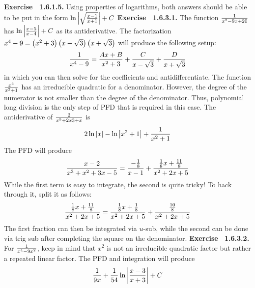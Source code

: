 {\noindent \protect \bf  Exercise ~1.6.1.5.} Using properties of logarithms, both answers should be able to be put in the form $\protect \qopname  \relax o{ln}\left | \protect \sqrt  {\protect \frac  {x-1}{x+1}}\right |+C$ \protect \newline  \protect \newline  
 {\noindent \protect \bf  Exercise ~1.6.3.1.} \textbullet The function $\protect \frac  {1}{x^2-9x+20}$ has $\protect \qopname  \relax o{ln}\left |\protect \frac  {x-5}{x-4}\right |+C$ as its antiderivative. \textbullet The factorization $x^4-9=\left (x^2+3\right )\left (x-\protect \sqrt  {3}\right )\left (x+\protect \sqrt  {3}\right )$ will produce the following setup: $$\protect \frac  {1}{x^4-9}=\protect \frac  {Ax+B}{x^2+3}+\protect \frac  {C}{x-\protect \sqrt  {3}}+\protect \frac  {D}{x+\protect \sqrt  {3}} $$ in which you can then solve for the coefficients and antidifferentiate. \textbullet The function $\protect \frac  {x^4}{x^2+1}$ has an irreducible quadratic for a denominator. However, the degree of the numerator is not smaller than the degree of the denominator. Thus, polynomial long division is the only step of PFD that is required in this case. \textbullet The antiderivative of $\protect \frac  {2}{x^5+2x3+x}$ is $$2\protect \qopname  \relax o{ln}|x|-\protect \qopname  \relax o{ln}\left | x^2+1\right |+\protect \frac  {1}{x^2+1}$$ \textbullet The PFD will produce $$ \protect \frac  {x-2}{x^3+x^2+3x-5}=\protect \frac  {-\protect \frac  {1}{8}}{x-1}+\protect \frac  {\protect \frac  {1}{8}x+\protect \frac  {11}{8}}{x^2+2x+5}$$ While the first term is easy to integrate, the second is quite tricky! To hack through it, split it as follows: $$\protect \frac  {\protect \frac  {1}{8}x+\protect \frac  {11}{8}}{x^2+2x+5}=\protect \frac  {\protect \frac  {1}{8}x+\protect \frac  {1}{8}}{x^2+2x+5}+\protect \frac  {\protect \frac  {10}{8}}{x^2+2x+5} $$ The first fraction can then be integrated via $u$-sub, while the second can be done via trig sub after completing the square on the denominator. \protect \newline  \protect \newline  
 {\noindent \protect \bf  Exercise ~1.6.3.2.} For $\protect \frac  {1}{x^4-9x^2}$, keep in mind that $x^2$ is not an irreducible quadratic factor but rather a repeated linear factor. The PFD and integration will produce $$\protect \frac  {1}{9x}+\protect \frac  {1}{54}\protect \qopname  \relax o{ln}\left |\protect \frac  {x-3}{x+3}\right |+C $$  \protect \newline  \protect \newline  
